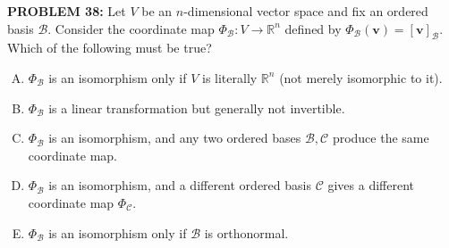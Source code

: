 \documentclass[12pt]{amsart}
\begin{document}
{\bf PROBLEM 38:}
%
Let $V$ be an $n$-dimensional vector space and fix
an ordered basis $\mathcal{B}$.  Consider the coordinate map
$\Phi_{\mathcal{B}} : V \to \mathbb{R}^n$ defined by
$\Phi_{\mathcal{B}}(\mathbf{v}) = [\mathbf{v}]_{\mathcal{B}}$.  Which
of the following must be true?
%
\begin{enumerate}[(A)]
\item $\Phi_{\mathcal{B}}$ is an isomorphism only if $V$ is literally $\mathbb{R}^n$ (not merely isomorphic to it).
\item $\Phi_{\mathcal{B}}$ is a linear transformation but generally not invertible.
\item $\Phi_{\mathcal{B}}$ is an isomorphism, and any two ordered bases $\mathcal{B}, \mathcal{C}$ produce the same coordinate map.
\item $\Phi_{\mathcal{B}}$ is an isomorphism, and a different ordered basis $\mathcal{C}$ gives a different coordinate map $\Phi_{\mathcal{C}}$.
\item $\Phi_{\mathcal{B}}$ is an isomorphism only if $\mathcal{B}$ is orthonormal.
\end{enumerate}
%
%
%
%
\end{document}
